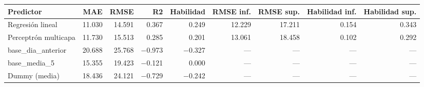 \begin{tabular}{lrrrrrrrr}
\toprule
Predictor & MAE & RMSE & R2 & Habilidad & RMSE inf. & RMSE sup. & Habilidad inf. & Habilidad sup. \\
\midrule
Regresión lineal & 11.030 & 14.591 & 0.367 & 0.249 & 12.229 & 17.211 & 0.154 & 0.343 \\
Perceptrón multicapa & 11.730 & 15.513 & 0.285 & 0.201 & 13.061 & 18.458 & 0.102 & 0.292 \\
base\_dia\_anterior & 20.688 & 25.768 & $-$0.973 & $-$0.327 & --- & --- & --- & --- \\
base\_media\_5 & 15.355 & 19.423 & $-$0.121 & 0.000 & --- & --- & --- & --- \\
Dummy (media) & 18.436 & 24.121 & $-$0.729 & $-$0.242 & --- & --- & --- & --- \\
\bottomrule
\end{tabular}
